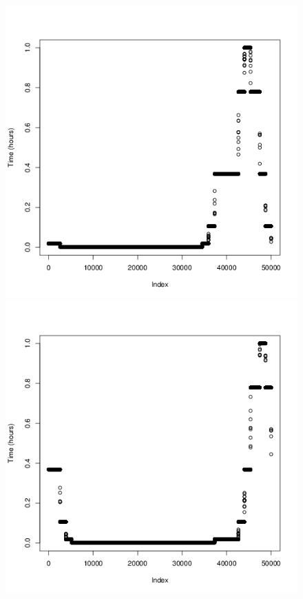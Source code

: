 \documentclass[a4paper, 12pt]{article}
\begin{document}
\begin{figure}[H]
\begin{minipage}[]{0.2\textwidth}
        \end{minipage}
        \begin{minipage}[]{0.2\textwidth}
            \includegraphics[width=\textwidth]{share/9_time.png}
        \end{minipage}
        \begin{minipage}[]{0.2\textwidth}
            \includegraphics[width=\textwidth]{share/10_time.png}

\end{minipage}
\end{figure}
\end{document}
